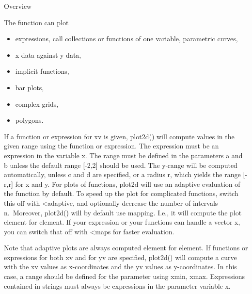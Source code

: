 \documentclass[
]{book}
\providecommand{\tightlist}{%
  \setlength{\itemsep}{0pt}\setlength{\parskip}{0pt}}
\begin{document}
Overview

The function can plot

\begin{itemize}
\tightlist
\item
  expressions, call collections or functions of one variable, parametric curves,
\item
  x data against y data,
\item
  implicit functions,
\item
  bar plots,
\item
  complex grids,
\item
  polygons.
\end{itemize}

If a function or expression for xv is given, plot2d() will compute values in the given range using the function or expression. The expression must be an expression in the variable x. The range must be defined in the parameters a and b unless the default range {[}-2,2{]} should be used. The y-range will be computed automatically, unless c and d are specified, or a radius r, which yields the range {[}-r,r{]} for x and y. For plots of functions, plot2d will use an adaptive evaluation of the function by default. To speed up the plot for complicated functions, switch this off with \textless adaptive, and optionally decrease the number of intervals n.~Moreover, plot2d() will by default use mapping. I.e., it will compute the plot element for element. If your expression or your functions can handle a vector x, you can switch that off with \textless maps for faster evaluation.

Note that adaptive plots are always computed element for element. If functions or expressions for both xv and for yv are specified, plot2d() will compute a curve with the xv values as x-coordinates and the yv values as y-coordinates. In this case, a range should be defined for the parameter using xmin, xmax. Expressions contained in strings must always be expressions in the parameter variable x.

\backmatter
\end{document}
